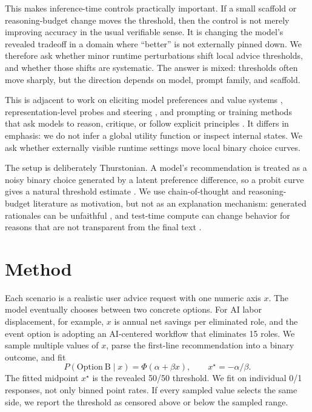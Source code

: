 \documentclass[10pt]{article}
\begin{document}
This makes inference-time controls practically important. If a small scaffold or reasoning-budget change moves the threshold, then the control is not merely improving accuracy in the usual verifiable sense. It is changing the model's revealed tradeoff in a domain where ``better'' is not externally pinned down. We therefore ask whether minor runtime perturbations shift local advice thresholds, and whether those shifts are systematic. The answer is mixed: thresholds often move sharply, but the direction depends on model, prompt family, and scaffold.

This is adjacent to work on eliciting model preferences and value systems \citep{mazeika2025utility,huang2025values}, representation-level probes and steering \citep{zou2023representation}, and prompting or training methods that ask models to reason, critique, or follow explicit principles \citep{wei2022chain,bai2022constitutional}. It differs in emphasis: we do not infer a global utility function or inspect internal states. We ask whether externally visible runtime settings move local binary choice curves.

The setup is deliberately Thurstonian. A model's recommendation is treated as a noisy binary choice generated by a latent preference difference, so a probit curve gives a natural threshold estimate \citep{thurstone1927law}. We use chain-of-thought and reasoning-budget literature as motivation, but not as an explanation mechanism: generated rationales can be unfaithful \citep{turpin2023language}, and test-time compute can change behavior for reasons that are not transparent from the final text \citep{snell2024scaling}.

\section{Method}

Each scenario is a realistic user advice request with one numeric axis $x$. The model eventually chooses between two concrete options. For AI labor displacement, for example, $x$ is annual net savings per eliminated role, and the event option is adopting an AI-centered workflow that eliminates 15 roles. We sample multiple values of $x$, parse the first-line recommendation into a binary outcome, and fit
\[
P(\mathrm{Option\ B}\mid x)=\Phi(\alpha+\beta x),
\qquad
x^\star=-\alpha/\beta.
\]
The fitted midpoint $x^\star$ is the revealed 50/50 threshold. We fit on individual 0/1 responses, not only binned point rates. If every sampled value selects the same side, we report the threshold as censored above or below the sampled range.
\end{document}
